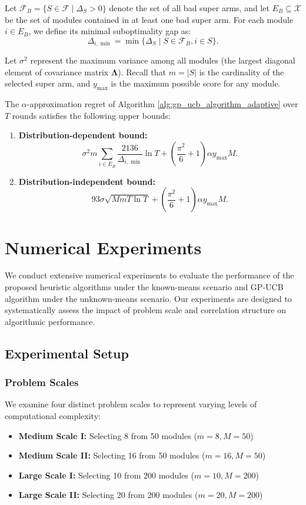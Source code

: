 \documentclass[opre,sglanonrev]{informs4}
\begin{document}
Let $\mathcal{F}_B = \{S \in \mathcal{F} \mid \Delta_S > 0\}$ denote the set of all bad super arms, and let $E_B \subseteq \mathcal{X}$ be the set of modules contained in at least one bad super arm. For each module $i \in E_B$, we define its minimal suboptimality gap as:
$$
\Delta_{i,\min} = \min\{\Delta_S \mid S \in \mathcal{F}_B, i \in S\}.
$$

Let $\sigma^2$ represent the maximum variance among all modules (the largest diagonal element of covariance matrix $\boldsymbol{\Lambda}$). Recall that $m = |S|$ is the cardinality of the selected super arm, and $y_{\text{max}}$ is the maximum possible score for any module.

\begin{theorem}
\label{thm:regret_bound}
The $\alpha$-approximation regret of Algorithm \ref{alg:gp_ucb_algorithm_adaptive} over $T$ rounds satisfies the following upper bounds:
\begin{enumerate}
    \item \textbf{Distribution-dependent bound:}
    $$
    \sigma^2 m \sum_{i \in E_B} \frac{2136}{\Delta_{i,\min}} \ln T + \left(\frac{\pi^2}{6} + 1\right) \alpha y_{\text{max}} M.
    $$
    
    \item \textbf{Distribution-independent bound:}
    $$
    93\sigma \sqrt{M m T \ln T} + \left(\frac{\pi^2}{6} + 1\right) \alpha y_{\text{max}} M.
    $$
\end{enumerate}
\end{theorem}

\section{Numerical Experiments}
\label{sec:experiments}

We conduct extensive numerical experiments to evaluate the performance of the proposed heuristic algorithms under the known-means scenario and GP-UCB algorithm under the unknown-means scenario. Our experiments are designed to systematically assess the impact of problem scale and correlation structure on algorithmic performance.

\subsection{Experimental Setup}

\subsubsection{Problem Scales}
We examine four distinct problem scales to represent varying levels of computational complexity:
\begin{itemize}
    \item \textbf{Medium Scale I:} Selecting 8 from 50 modules ($m=8, M=50$)
    \item \textbf{Medium Scale II:} Selecting 16 from 50 modules ($m=16, M=50$)
    \item \textbf{Large Scale I:} Selecting 10 from 200 modules ($m=10, M=200$)
    \item \textbf{Large Scale II:} Selecting 20 from 200 modules ($m=20, M=200$)
\end{itemize}
\end{document}
